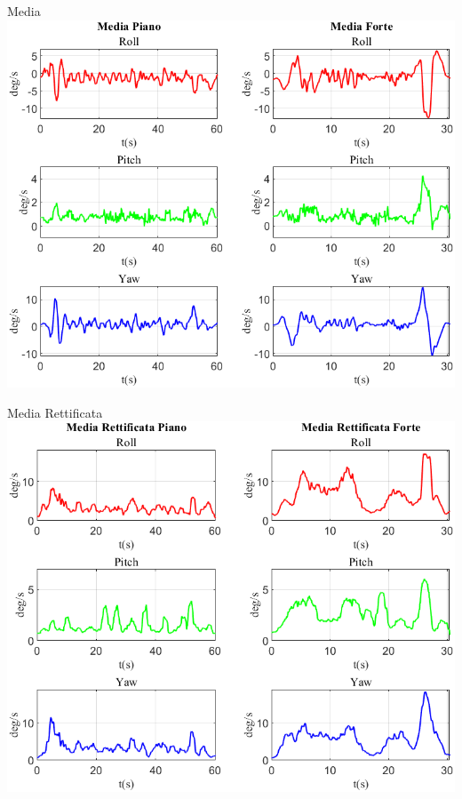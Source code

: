 	\begin{frame}{{Media}}
		\centering\includegraphics[height=.8\textheight]{figure/VAng/Media}
	\end{frame}
	
	\begin{frame}{{Media Rettificata}}
		\centering\includegraphics[height=.8\textheight]{figure/VAng/Media Rettificata}
	\end{frame}
	
